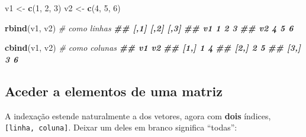\documentclass[
  portuguese,
  11pt,
  openany]{book}
\newenvironment{Shaded}{\begin{snugshade}}{\end{snugshade}}
\newcommand{\CommentTok}[1]{\textcolor[rgb]{0.56,0.35,0.01}{\textit{#1}}}
\newcommand{\DecValTok}[1]{\textcolor[rgb]{0.00,0.00,0.81}{#1}}
\newcommand{\DocumentationTok}[1]{\textcolor[rgb]{0.56,0.35,0.01}{\textbf{\textit{#1}}}}
\newcommand{\FunctionTok}[1]{\textcolor[rgb]{0.13,0.29,0.53}{\textbf{#1}}}
\newcommand{\NormalTok}[1]{#1}
\newcommand{\OtherTok}[1]{\textcolor[rgb]{0.56,0.35,0.01}{#1}}
\begin{document}
\begin{Shaded}
\begin{Highlighting}[]
\NormalTok{v1 }\OtherTok{\textless{}{-}} \FunctionTok{c}\NormalTok{(}\DecValTok{1}\NormalTok{, }\DecValTok{2}\NormalTok{, }\DecValTok{3}\NormalTok{)}
\NormalTok{v2 }\OtherTok{\textless{}{-}} \FunctionTok{c}\NormalTok{(}\DecValTok{4}\NormalTok{, }\DecValTok{5}\NormalTok{, }\DecValTok{6}\NormalTok{)}

\FunctionTok{rbind}\NormalTok{(v1, v2)     }\CommentTok{\# como linhas}
\DocumentationTok{\#\#    [,1] [,2] [,3]}
\DocumentationTok{\#\# v1    1    2    3}
\DocumentationTok{\#\# v2    4    5    6}

\FunctionTok{cbind}\NormalTok{(v1, v2)     }\CommentTok{\# como colunas}
\DocumentationTok{\#\#      v1 v2}
\DocumentationTok{\#\# [1,]  1  4}
\DocumentationTok{\#\# [2,]  2  5}
\DocumentationTok{\#\# [3,]  3  6}
\end{Highlighting}
\end{Shaded}

\subsection{Aceder a elementos de uma matriz}\label{aceder-a-elementos-de-uma-matriz}

A indexação estende naturalmente a dos vetores, agora com \textbf{dois} índices,
\texttt{{[}linha,\ coluna{]}}. Deixar um deles em branco significa ``todas'':
\end{document}

